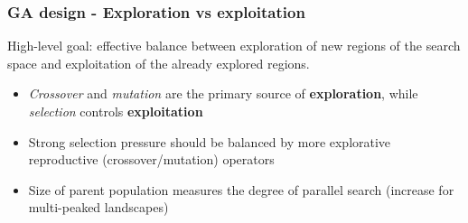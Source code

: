 \documentclass{beamer}
\begin{document}
			\begin{frame}
				\frametitle{GA design - Exploration vs exploitation}
				High-level goal: effective balance between exploration of new regions of the search space and exploitation of the already explored regions.
				
				\vspace{5mm}
				
				\begin{itemize}
					\item \textit{Crossover} and \textit{mutation} are the primary source of \textbf{exploration}, while \textit{selection} controls \textbf{exploitation}
					\item Strong selection pressure should be balanced by more explorative reproductive (crossover/mutation) operators
					\item Size of parent population measures the degree of parallel search (increase for multi-peaked landscapes)
				\end{itemize}
				
			\end{frame}
			
\end{document}
